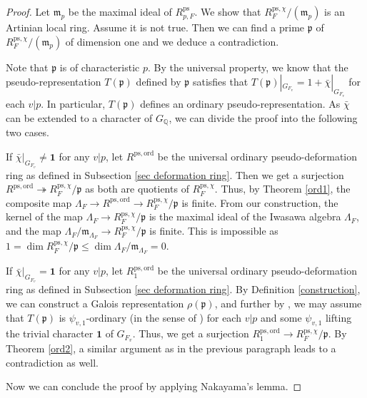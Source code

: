\documentclass[a4paper, 12pt]{amsart}
\def\ps{\mathrm{ps}}
\def\ord{\mathrm{ord}}
\newcommand{\Q}{\mathbb{Q}}
\newcommand{\kp}{\mathfrak{p}}
\begin{document}
    \begin{proof}
    	Let $\mathfrak{m}_p$ be the maximal ideal of $R_{p, F}^\ps$. We show that $ R_{F}^{\ps, \chi}/(\mathfrak{m}_p)$ is an Artinian local ring. Assume it is not true. Then we can find a prime $\kp$ of $ R_{F}^{\ps, \chi}/(\mathfrak{m}_p)$ of dimension one and we deduce a contradiction.
    	
    	 Note that $\kp$ is of characteristic $p$. By the universal property, we know that the pseudo-representation $T(\kp)$ defined by $\kp$ satisfies that $T(\kp)|_{G_{F_v}} = 1+\bar{\chi}|_{G_{F_v}}$ for each $v|p$. In particular, $T(\kp)$ defines an ordinary pseudo-representation. As $\bar{\chi} $ can be extended to a character of $G_{\Q}$, we can divide the proof into the following two cases.
    	
    	If $\bar{\chi}|_{G_{F_v}} \ne \mathbf{1}$ for any $v|p$, let $R^{\ps, \ord}$ be the universal ordinary pseudo-deformation ring as defined in Subsection \ref{sec deformation ring}. Then we get a surjection $R^{\ps, \ord} \twoheadrightarrow R_{F}^{\ps, \chi}/\kp$ as both are quotients of $ R_{F}^{\ps, \chi}$. Thus, by Theorem \ref{ord1}, the composite map $\Lambda_F \to R^{\ps, \ord} \to R_{F}^{\ps, \chi}/\kp$ is finite. From our construction, the kernel of the map $ \Lambda_F \to R_{F}^{\ps, \chi}/\kp$ is the maximal ideal of the Iwasawa algebra $\Lambda_F $, and the map $\Lambda_F/\mathfrak{m}_{\Lambda_F} \to R_{F}^{\ps, \chi}/\kp$ is finite. This is impossible as $1=\dim R_{F}^{\ps, \chi}/\kp \le \dim \Lambda_F/\mathfrak{m}_{\Lambda_F} =0$.
    	
    	If $\bar{\chi}|_{G_{F_v}} = \mathbf{1}$ for any $v|p$, let $R_1^{\ps, \ord}$ be the universal ordinary pseudo-deformation ring as defined in Subsection \ref{sec deformation ring}. By Definition \ref{construction}, we can construct a Galois representation $\rho(\kp)$, and further by \cite[Lemma 5.3.2]{pan2022fontaine}, we may assume that $T(\kp)$ is $\psi_{v,1}$-ordinary (in the sense of \cite[Definition 5.3.1]{pan2022fontaine}) for each $v|p$ and some $\psi_{v,1}$ lifting the trivial character $\mathbf{1}$ of $G_{F_v}$. Thus, we get a surjection $R_1^{\ps, \ord} \to R_{F}^{\ps, \chi}/\kp $. By Theorem \ref{ord2}, a similar argument as in the previous paragraph leads to a contradiction as well. 
    	
    	Now we can conclude the proof by applying Nakayama's lemma.
    \end{proof}
    
\end{document}
